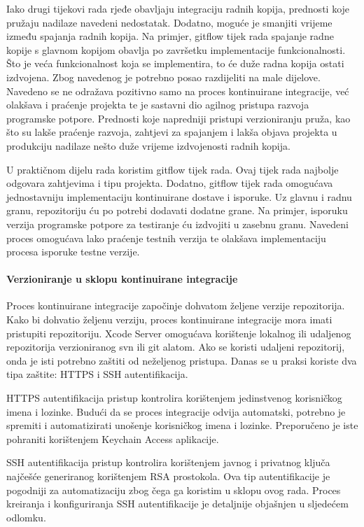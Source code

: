 \documentclass[times, utf8, diplomski, numeric]{fer}
\begin{document}
Iako drugi tijekovi rada rjeđe obavljaju integraciju radnih kopija, prednosti koje pružaju nadilaze navedeni nedostatak. Dodatno, moguće je smanjiti vrijeme između spajanja radnih kopija. Na primjer, gitflow tijek rada spajanje radne kopije s glavnom kopijom obavlja po završetku implementacije funkcionalnosti. Što je veća funkcionalnost koja se implementira, to će duže radna kopija ostati izdvojena. Zbog navedenog je potrebno posao razdijeliti na male dijelove. Navedeno se ne odražava pozitivno samo na proces kontinuirane integracije, već olakšava i praćenje projekta te je sastavni dio agilnog pristupa razvoja programske potpore. Prednosti koje napredniji pristupi verzioniranju pruža, kao što su lakše praćenje razvoja, zahtjevi za spajanjem i lakša objava projekta u produkciju nadilaze nešto duže vrijeme izdvojenosti radnih kopija.

U praktičnom dijelu rada koristim gitflow tijek rada. Ovaj tijek rada najbolje odgovara zahtjevima i tipu projekta. Dodatno, gitflow tijek rada omogućava jednostavniju implementaciju kontinuirane dostave i isporuke. Uz glavnu i radnu granu, repozitoriju ću po potrebi dodavati dodatne grane. Na primjer, isporuku verzija programske potpore za testiranje ću izdvojiti u zasebnu granu. Navedeni proces omogućava lako praćenje testnih verzija te olakšava implementaciju procesa isporuke testne verzije.

\paragraph{Verzioniranje u sklopu kontinuirane integracije}

Proces kontinuirane integracije započinje dohvatom željene verzije repozitorija. Kako bi dohvatio željenu verziju, proces kontinuirane integracije mora imati pristupiti repozitoriju. Xcode Server omogućava korištenje lokalnog ili udaljenog repozitorija verzioniranog svn ili git alatom. Ako se koristi udaljeni repozitorij, onda je isti potrebno zaštiti od neželjenog pristupa. Danas se u praksi koriste dva tipa zaštite: HTTPS i SSH autentifikacija.

HTTPS autentifikacija pristup kontrolira korištenjem jedinstvenog korisničkog imena i lozinke. Budući da se proces integracije odvija automatski, potrebno je spremiti i automatizirati unošenje korisničkog imena i lozinke. Preporučeno je iste pohraniti korištenjem Keychain Access aplikacije.

SSH autentifikacija pristup kontrolira korištenjem javnog i privatnog ključa najčešće generiranog korištenjem RSA prostokola. Ova tip autentifikacije je pogodniji za automatizaciju zbog čega ga koristim u sklopu ovog rada. Proces kreiranja i konfiguriranja SSH autentifikacije je detaljnije objašnjen u sljedećem odlomku.
\end{document}
